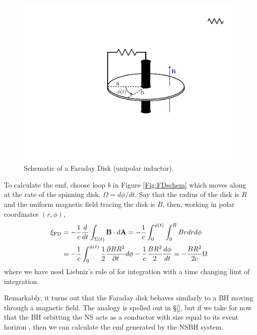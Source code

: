 \begin{figure}
\begin{center}
\includegraphics[scale=0.33]{figures/ch0/UI_schematic} 
\end{center}
\caption{Schematic of a Faraday Disk (unipolar inductor).}
\label{Fig:Contour}
\end{figure}


To calculate the emf, choose loop $b$ in Figure \ref{Fig:FDschem} which moves
along at the rate of the spinning disk, $\Omega = d\phi/dt$. Say that the
radius of the disk is $R$ and the uniform magnetic field tracing the disk is $B$, then, working in polar coordinates $(r, \phi)$,
\begin{align}
\xi_{\rm FD} &= - \frac{1}{c} \frac{d}{dt} \int_{\Sigma(t)}{{\bf B} \cdot d{\bf A}} =  - \frac{1}{c} \int^{\phi(t)}_{0} \int^{R}_{0}{B r dr d\phi}  \\
&= - \frac{1}{c} \int^{\phi(t)}_{0}{\frac{1}{2}\frac{\partial B R^2}{\partial t} d\phi} -  \frac{1}{c} \frac{B R^2}{2} \frac{d\phi}{dt}  = -\frac{B R^2}{2c} \Omega
\end{align}
where we have used Liebniz's rule of for integration with a time changing limt of integration. 

Remarkably, it turns out that the Faraday disk behaves similarly to a BH
moving through a magnetic field. The analogy is spelled out in \S \ref{}, but
if we take for now that the BH orbitting the NS acts as a conductor with size
equal to its event horizon \citep{MPBook}, then we can calculate the emf
generated by the NSBH system. 

